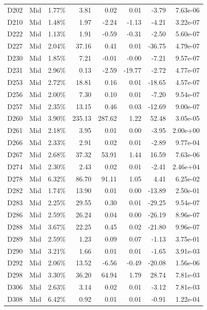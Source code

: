 \begin{tabular}{l l r r r r r r}
D202 & Mid & 1.77\% & 3.81 & 0.02 & 0.01 & -3.79 & 7.63e-06 \\
D210 & Mid & 1.48\% & 1.97 & -2.24 & -1.13 & -4.21 & 3.22e-07 \\
D222 & Mid & 1.13\% & 1.91 & -0.59 & -0.31 & -2.50 & 5.60e-07 \\
D227 & Mid & 2.04\% & 37.16 & 0.41 & 0.01 & -36.75 & 4.79e-07 \\
D230 & Mid & 1.85\% & 7.21 & -0.01 & -0.00 & -7.21 & 9.57e-07 \\
D231 & Mid & 2.96\% & 0.13 & -2.59 & -19.77 & -2.72 & 4.77e-07 \\
D253 & Mid & 2.72\% & 18.81 & 0.16 & 0.01 & -18.65 & 4.57e-07 \\
D256 & Mid & 2.00\% & 7.30 & 0.10 & 0.01 & -7.20 & 9.54e-07 \\
D257 & Mid & 2.35\% & 13.15 & 0.46 & 0.03 & -12.69 & 9.00e-07 \\
D260 & Mid & 3.90\% & 235.13 & 287.62 & 1.22 & 52.48 & 3.05e-05 \\
D261 & Mid & 2.18\% & 3.95 & 0.01 & 0.00 & -3.95 & 2.00e+00 \\
D266 & Mid & 2.33\% & 2.91 & 0.02 & 0.01 & -2.89 & 9.77e-04 \\
D267 & Mid & 2.68\% & 37.32 & 53.91 & 1.44 & 16.59 & 7.63e-06 \\
D274 & Mid & 2.30\% & 2.43 & 0.02 & 0.01 & -2.41 & 2.46e+04 \\
D278 & Mid & 6.32\% & 86.70 & 91.11 & 1.05 & 4.41 & 6.25e-02 \\
D282 & Mid & 1.74\% & 13.90 & 0.01 & 0.00 & -13.89 & 2.50e-01 \\
D283 & Mid & 2.25\% & 29.55 & 0.30 & 0.01 & -29.25 & 9.54e-07 \\
D286 & Mid & 2.59\% & 26.24 & 0.04 & 0.00 & -26.19 & 8.96e-07 \\
D288 & Mid & 3.67\% & 22.25 & 0.45 & 0.02 & -21.80 & 9.96e-07 \\
D289 & Mid & 2.59\% & 1.23 & 0.09 & 0.07 & -1.13 & 3.75e-01 \\
D290 & Mid & 3.21\% & 1.66 & 0.01 & 0.01 & -1.65 & 3.91e-03 \\
D292 & Mid & 2.06\% & 13.52 & -6.56 & -0.49 & -20.08 & 1.56e-06 \\
D298 & Mid & 3.30\% & 36.20 & 64.94 & 1.79 & 28.74 & 7.81e-03 \\
D306 & Mid & 2.63\% & 3.14 & 0.02 & 0.01 & -3.12 & 7.81e-03 \\
D308 & Mid & 6.42\% & 0.92 & 0.01 & 0.01 & -0.91 & 1.22e-04 \\

\end{tabular}
